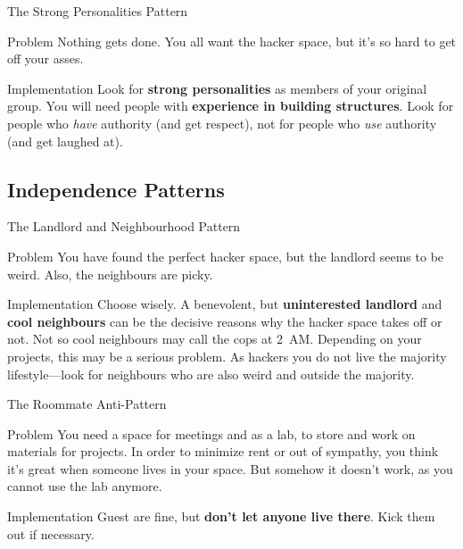 \documentclass[mathserif]{beamer}
\begin{document}
\begin{frame}{The Strong Personalities Pattern}
	\begin{alertblock}{Problem}
		Nothing gets done.  You all want the hacker space, but it's so hard to get
		off your asses.
	\end{alertblock}
	\pause
	\begin{exampleblock}{Implementation}
		Look for \textbf{strong personalities} as members of your original group.
		You will need people with \textbf{experience in building structures}.  Look
		for people who \emph{have} authority (and get respect), not for people who
		\emph{use} authority (and get laughed at).
	\end{exampleblock}
\end{frame}


\subsection{Independence Patterns}

\begin{frame}{The Landlord and Neighbourhood Pattern}
	\begin{alertblock}{Problem}
		You have found the perfect hacker space, but the landlord seems to be weird.
		Also, the neighbours are picky.
	\end{alertblock}
	\pause
	\begin{exampleblock}{Implementation}
		Choose wisely.  A benevolent, but \textbf{uninterested landlord} and
		\textbf{cool neighbours} can be the decisive reasons why the hacker space
		takes off or not.  Not so cool neighbours may call the cops at 2~AM.
		Depending on your projects, this may be a serious problem.  As hackers you
		do not live the majority lifestyle---look for neighbours who are also weird
		and outside the majority.
	\end{exampleblock}
\end{frame}

\begin{frame}{The Roommate Anti-Pattern}
	\begin{alertblock}{Problem}
		You need a space for meetings and as a lab, to store and work on materials
		for projects.  In order to minimize rent or out of sympathy, you think it's
		great when someone lives in your space. But somehow it doesn't work, as you
		cannot use the lab anymore.
	\end{alertblock}
	\pause
	\begin{exampleblock}{Implementation}
		Guest are fine, but \textbf{don't let anyone live there}.  Kick them out if
		necessary.
	\end{exampleblock}
\end{frame}
\end{document}
